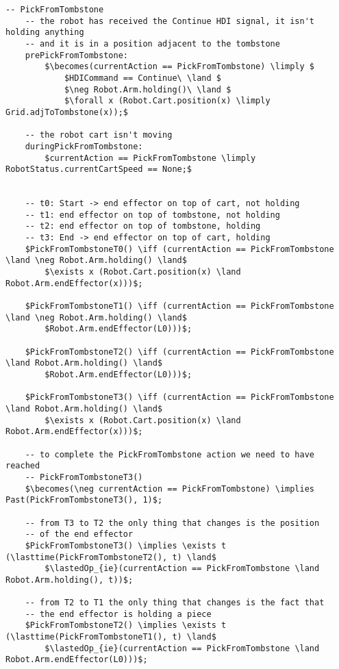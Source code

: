 \begin{lstlisting}[fontadjust, mathescape, frame=single]
  -- PickFromTombstone
    -- the robot has received the Continue HDI signal, it isn't holding anything 
    -- and it is in a position adjacent to the tombstone
    prePickFromTombstone:
        $\becomes(currentAction == PickFromTombstone) \limply $
            $HDICommand == Continue\ \land $
            $\neg Robot.Arm.holding()\ \land $
            $\forall x (Robot.Cart.position(x) \limply Grid.adjToTombstone(x));$

    -- the robot cart isn't moving
    duringPickFromTombstone:
        $currentAction == PickFromTombstone \limply RobotStatus.currentCartSpeed == None;$
        

    -- t0: Start -> end effector on top of cart, not holding
    -- t1: end effector on top of tombstone, not holding
    -- t2: end effector on top of tombstone, holding
    -- t3: End -> end effector on top of cart, holding
    $PickFromTombstoneT0() \iff (currentAction == PickFromTombstone \land \neg Robot.Arm.holding() \land$
        $\exists x (Robot.Cart.position(x) \land Robot.Arm.endEffector(x)))$;
    
    $PickFromTombstoneT1() \iff (currentAction == PickFromTombstone \land \neg Robot.Arm.holding() \land$
        $Robot.Arm.endEffector(L0)))$;
    
    $PickFromTombstoneT2() \iff (currentAction == PickFromTombstone \land Robot.Arm.holding() \land$
        $Robot.Arm.endEffector(L0)))$;
    
    $PickFromTombstoneT3() \iff (currentAction == PickFromTombstone \land Robot.Arm.holding() \land$
        $\exists x (Robot.Cart.position(x) \land Robot.Arm.endEffector(x)))$;
    
    -- to complete the PickFromTombstone action we need to have reached
    -- PickFromTombstoneT3()
    $\becomes(\neg currentAction == PickFromTombstone) \implies Past(PickFromTombstoneT3(), 1)$;
    
    -- from T3 to T2 the only thing that changes is the position
    -- of the end effector
    $PickFromTombstoneT3() \implies \exists t (\lasttime(PickFromTombstoneT2(), t) \land$
        $\lastedOp_{ie}(currentAction == PickFromTombstone \land Robot.Arm.holding(), t))$;

    -- from T2 to T1 the only thing that changes is the fact that
    -- the end effector is holding a piece
    $PickFromTombstoneT2() \implies \exists t (\lasttime(PickFromTombstoneT1(), t) \land$
        $\lastedOp_{ie}(currentAction == PickFromTombstone \land Robot.Arm.endEffector(L0)))$;
    

\end{lstlisting}
